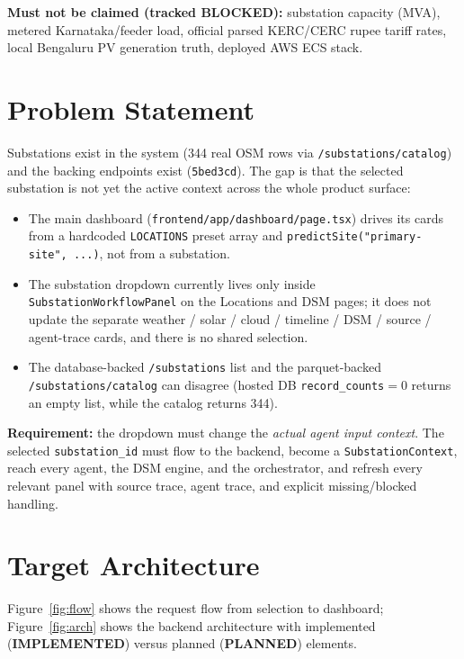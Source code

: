 \documentclass[11pt,a4paper]{article}
\newcommand{\stImpl}{\textcolor{cok}{\textbf{IMPLEMENTED}}}
\newcommand{\stB}{\textcolor{cmiss}{\textbf{BLOCKED}}}
\newcommand{\stPlan}{\textcolor{cplan}{\textbf{PLANNED}}}
\newcommand{\code}[1]{\texttt{\small #1}}
\begin{document}
\noindent\textbf{Must not be claimed (tracked \stB):} substation capacity (MVA), metered
Karnataka/feeder load, official parsed KERC/CERC rupee tariff rates, local Bengaluru PV generation
truth, deployed AWS ECS stack.

\section{Problem Statement}
Substations exist in the system (344 real OSM rows via \code{/substations/catalog}) and the
backing endpoints exist (\code{5bed3cd}). The gap is that the selected substation is not yet the
active context across the whole product surface:
\begin{itemize}[leftmargin=1.4em,itemsep=1pt]
  \item The main dashboard (\code{frontend/app/dashboard/page.tsx}) drives its cards from a
        hardcoded \code{LOCATIONS} preset array and \code{predictSite("primary-site", ...)}, not
        from a substation.
  \item The substation dropdown currently lives only inside \code{SubstationWorkflowPanel} on the
        Locations and DSM pages; it does not update the separate weather / solar / cloud /
        timeline / DSM / source / agent-trace cards, and there is no shared selection.
  \item The database-backed \code{/substations} list and the parquet-backed
        \code{/substations/catalog} can disagree (hosted DB \code{record\_counts}$=0$ returns an
        empty list, while the catalog returns 344).
\end{itemize}
\noindent\textbf{Requirement:} the dropdown must change the \emph{actual agent input context}. The
selected \code{substation\_id} must flow to the backend, become a \code{SubstationContext}, reach
every agent, the DSM engine, and the orchestrator, and refresh every relevant panel with source
trace, agent trace, and explicit missing/blocked handling.

\section{Target Architecture}
Figure~\ref{fig:flow} shows the request flow from selection to dashboard;
Figure~\ref{fig:arch} shows the backend architecture with implemented (\stImpl) versus planned
(\stPlan) elements.
\end{document}
